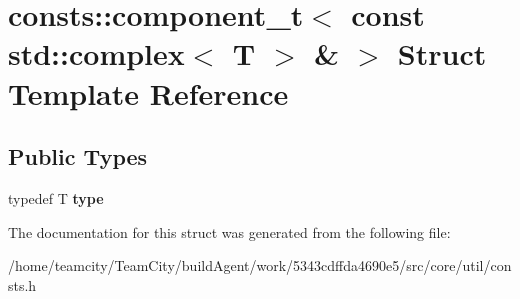 \hypertarget{structconsts_1_1component__t_3_01const_01std_1_1complex_3_01T_01_4_01_6_01_4}{}\section{consts\+:\+:component\+\_\+t$<$ const std\+:\+:complex$<$ T $>$ \& $>$ Struct Template Reference}
\label{structconsts_1_1component__t_3_01const_01std_1_1complex_3_01T_01_4_01_6_01_4}
\subsection*{Public Types}
\begin{DoxyCompactItemize}
\item 
typedef T {\bfseries type}\hypertarget{structconsts_1_1component__t_3_01const_01std_1_1complex_3_01T_01_4_01_6_01_4_a9cc3483e66e52b0c195e16b93a7548c3}{}\label{structconsts_1_1component__t_3_01const_01std_1_1complex_3_01T_01_4_01_6_01_4_a9cc3483e66e52b0c195e16b93a7548c3}

\end{DoxyCompactItemize}


The documentation for this struct was generated from the following file\+:\begin{DoxyCompactItemize}
\item 
/home/teamcity/\+Team\+City/build\+Agent/work/5343cdffda4690e5/src/core/util/consts.\+h\end{DoxyCompactItemize}
